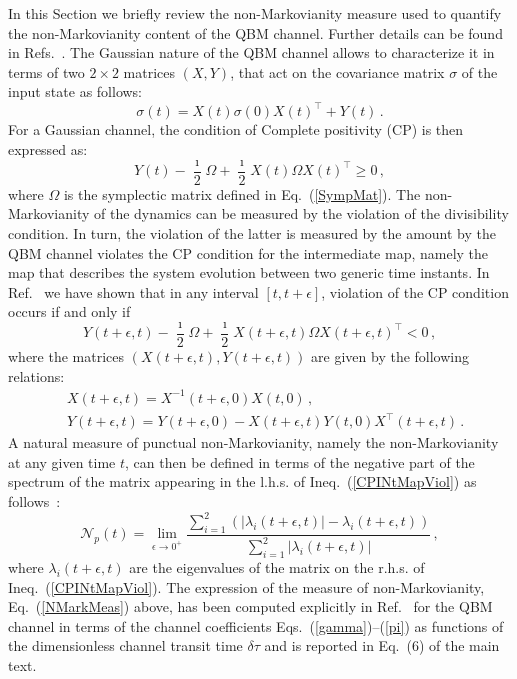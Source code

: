 \documentclass[prl,twocolumn,aps,floatfix,showpacs,tightenlines,superscriptaddress,amsmath,amssymb,amsfonts,10pt]{revtex4-1}
\begin{document}
In this Section we briefly review the non-Markovianity measure used to quantify the non-Markovianity content of the QBM channel. Further details can be found in Refs.~\cite{PhysRevLett.115.070401, TorreAsym2017}. The Gaussian nature of the QBM channel allows to characterize it in terms of two $2 \times 2 $ matrices $(X, Y)$, that act on the covariance matrix $\sigma$ of the input state as follows:
\begin{displaymath}
\sigma(t) = X(t)\sigma(0)X(t)^\intercal+Y(t) \, .
\end{displaymath}
For a Gaussian channel, the condition of Complete positivity (CP) is then expressed as:
\begin{equation}
Y(t)-\dfrac{\imath}{2}\Omega+\frac{\imath}{2}X(t)\Omega X(t)^\intercal \geq 0 \, ,
\end{equation}
where $\Omega$ is the symplectic matrix defined in Eq.~(\ref{SympMat}).
The non-Markovianity of the dynamics can be measured by the violation of the divisibility condition. In turn, the violation of the latter is measured by the amount by the QBM channel violates the CP condition for the intermediate map, namely the map that describes the system evolution between two generic time instants. In Ref.~\cite{PhysRevLett.115.070401} we have shown that in any interval $[t, t+\epsilon]$, violation of the CP condition occurs if and only if
\begin{equation}\label{CPINtMapViol}
Y(t+\epsilon, t)-\dfrac{\imath}{2}\Omega+\frac{\imath}{2}X(t+\epsilon, t)\Omega X(t+\epsilon, t)^\intercal < 0 \, ,
\end{equation}
where the matrices $(X(t+\epsilon, t), Y(t+\epsilon, t))$ are given by the following relations:
\begin{align}
 & X(t+\epsilon, t)=X^{-1}(t+\epsilon, 0)X(t,0) \, , \nonumber \\
 & Y(t+\epsilon, t)=Y(t+\epsilon, 0)-X(t+\epsilon, t)Y(t,0)X^\intercal(t+\epsilon, t) \, .
\end{align}
A natural measure of punctual non-Markovianity, namely the non-Markovianity at any given time $t$, can then be defined in terms of the negative part of the spectrum of the matrix appearing in the l.h.s. of Ineq.~(\ref{CPINtMapViol}) as follows~\cite{PhysRevLett.115.070401,TorreAsym2017}:
\begin{equation}\label{NMarkMeas}
\mathcal{N}_p(t)=\lim_{\epsilon\rightarrow 0^+}\dfrac{\sum_{i=1}^2\left(\vert\lambda_i(t+\epsilon, t)\vert-\lambda_i(t+\epsilon, t)\right)}{\sum_{i=1}^2\vert\lambda_i(t+\epsilon, t)\vert} \, ,
\end{equation}
where $\lambda_i(t+\epsilon, t)$ are the eigenvalues of the matrix on the r.h.s. of Ineq.~(\ref{CPINtMapViol}). The expression of the measure of non-Markovianity, Eq.~(\ref{NMarkMeas}) above, has been computed explicitly in Ref.~\cite{TorreAsym2017} for the QBM channel in terms of the channel coefficients Eqs.~(\ref{gamma})--(\ref{pi}) as functions of the dimensionless channel transit time $\delta \tau$ and is reported in Eq.~(6) of the main text.
\end{document}
